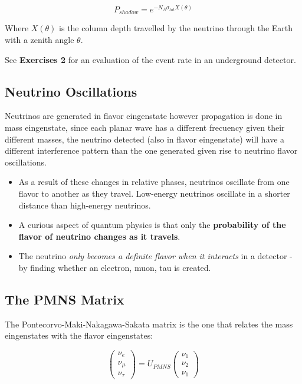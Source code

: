\documentclass[
  letterpaper,
  DIV=11,
  numbers=noendperiod]{scrreprt}
\begin{document}
\[P_{shadow} = e^{-N_A \sigma_{tot} X(\theta)}\]

Where \(X(\theta)\) is the column depth travelled by the neutrino
through the Earth with a zenith angle \(\theta\).

See \textbf{Exercises 2} for an evaluation of the event rate in an
underground detector.

\subsection{Neutrino Oscillations}\label{neutrino-oscillations}

Neutrinos are generated in flavor eingenstate however propagation is
done in mass eingenstate, since each planar wave has a different
frecuency given their different masses, the neutrino detected (also in
flavor eingenstate) will have a different interference pattern than the
one generated given rise to neutrino flavor oscillations.

\begin{itemize}
\item
  As a result of these changes in relative phases, neutrinos oscillate
  from one flavor to another as they travel. Low-energy neutrinos
  oscillate in a shorter distance than high-energy neutrinos.
\item
  A curious aspect of quantum physics is that only the
  \textbf{probability of the flavor of neutrino changes as it travels}.
\item
  The neutrino \emph{only becomes a definite flavor when it interacts}
  in a detector - by finding whether an electron, muon, tau is created.
\end{itemize}

\subsection{The PMNS Matrix}\label{the-pmns-matrix}

The Pontecorvo-Maki-Nakagawa-Sakata matrix is the one that relates the
mass eingenstates with the flavor eingenstates:

\[\begin{pmatrix} \nu_e \\ \nu_\mu \\ \nu_\tau \end{pmatrix} = U_{PMNS} \begin{pmatrix} \nu_1 \\ \nu_2 \\ \nu_1 \end{pmatrix}\]
\end{document}
